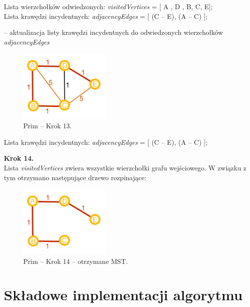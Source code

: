 \begin{center}
	Lista wierzchołków odwiedzonych: \emph{visitedVertices} = [ A , D , B, C, E];\\
	Lista krawędzi incydentnych: \emph{adjacencyEdges} = [ (C -- E), (A -- C) ];\\
\end{center}
-- aktualizacja listy krawędzi incydentnych do odwiedzonych wierzchołków \emph{adjacencyEdges}
\begin{figure}[htb!]
	\centering
	\includegraphics[width=0.4\textwidth]{tex/fig/graf11}
	\caption{Prim -- Krok 13.}
	\label{fig: g11}
\end{figure}
\begin{center}
	Lista krawędzi incydentnych: \emph{adjacencyEdges} = [ (C -- E), (A -- C) ];\\
\end{center}
\newpage
\textbf{Krok 14.}\\
Lista \emph{visitedVertices} zwiera wszystkie wierzchołki grafu wejściowego. W związku z tym otrzymano następujące drzewo rozpinające:\\
\begin{figure}[htb!]
	\centering
	\includegraphics[width=0.4\textwidth]{tex/fig/graf12}
	\caption{Prim -- Krok 14 -- otrzymane MST.}
	\label{fig: g14}
\end{figure}
\newpage
\section{Składowe implementacji algorytmu}

